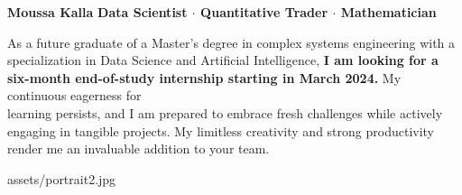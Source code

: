 \documentclass[theme]{cv_einstein}
\begin{document}
    \header
    {\textbf{Moussa Kalla}}
    {\textbf{Data Scientist  $\cdot$ Quantitative Trader $\cdot$ Mathematician}}
    { \normalsize  
As a future graduate of a Master's degree in complex systems engineering with a specialization in Data Science and Artificial Intelligence,
\textbf{I am looking for a six-month end-of-study internship starting in March 2024.}
My continuous eagerness for \\ learning persists, and I am prepared to embrace fresh challenges while actively \\ engaging in tangible projects. My limitless creativity and strong productivity render me an invaluable addition to your team.

}
    {assets/portrait2.jpg}


    \vspace{\headerheight} %
\end{document}
